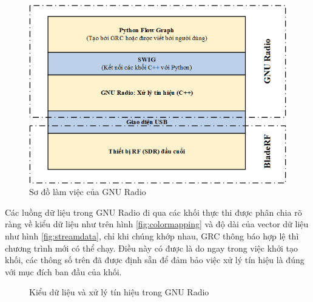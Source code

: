 \begin{figure} [!htb]
	\centering
	\includegraphics[width=0.9\linewidth]{figures/SWIG.png}
	\caption{Sơ đồ làm việc của GNU Radio}
	\label{fig:SWIG}
\end{figure}

Các luồng dữ liệu trong GNU Radio đi qua các khối thực thi được phân chia rõ ràng về kiểu dữ liệu như trên hình \ref{fig:colormapping} và độ dài của vector dữ liệu như hình \ref{fig:streamdata}, chỉ khi chúng khớp nhau, GRC thông báo hợp lệ thì chương trình mới có thể chạy. Điều này có được là do ngay trong việc khởi tạo khối, các thông số trên đã được định sẵn để đảm bảo việc xử lý tín hiệu là đúng với mục đích ban đầu của khối.

\begin{figure}[!h]
\centering
{}
\hfill
{}
\hfill
\caption{Kiểu dữ liệu và xử lý tín hiệu trong GNU Radio}
\end{figure}

